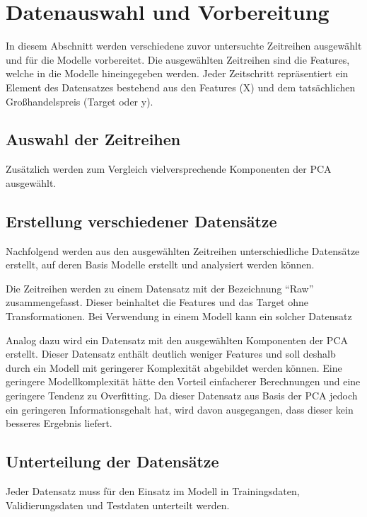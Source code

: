 \section{Datenauswahl und Vorbereitung}
In diesem Abschnitt werden verschiedene zuvor untersuchte Zeitreihen ausgewählt und für die Modelle vorbereitet. Die ausgewählten Zeitreihen sind die Features, welche in die Modelle hineingegeben werden. Jeder Zeitschritt repräsentiert ein Element des Datensatzes bestehend aus den Features (X) und dem tatsächlichen Großhandelspreis (Target oder y).

\subsection{Auswahl der Zeitreihen}

Zusätzlich werden zum Vergleich vielversprechende Komponenten der PCA ausgewählt. 

\subsection{Erstellung verschiedener Datensätze}
Nachfolgend werden aus den ausgewählten Zeitreihen unterschiedliche Datensätze erstellt, auf deren Basis Modelle erstellt und analysiert werden können.

Die Zeitreihen werden zu einem Datensatz mit der Bezeichnung ``Raw'' zusammengefasst. Dieser beinhaltet die Features und das Target ohne Transformationen. Bei Verwendung in einem Modell kann ein solcher Datensatz   

Analog dazu wird ein Datensatz mit den ausgewählten Komponenten der PCA erstellt. Dieser Datensatz enthält deutlich weniger Features und soll deshalb durch ein Modell mit geringerer Komplexität abgebildet werden können. Eine geringere Modellkomplexität hätte den Vorteil einfacherer Berechnungen und eine geringere Tendenz zu Overfitting. Da dieser Datensatz aus Basis der PCA jedoch ein geringeren Informationsgehalt hat, wird davon ausgegangen, dass dieser kein besseres Ergebnis liefert.

\subsection{Unterteilung der Datensätze}
Jeder Datensatz muss für den Einsatz im Modell in Trainingsdaten, Validierungsdaten und Testdaten unterteilt werden. 

